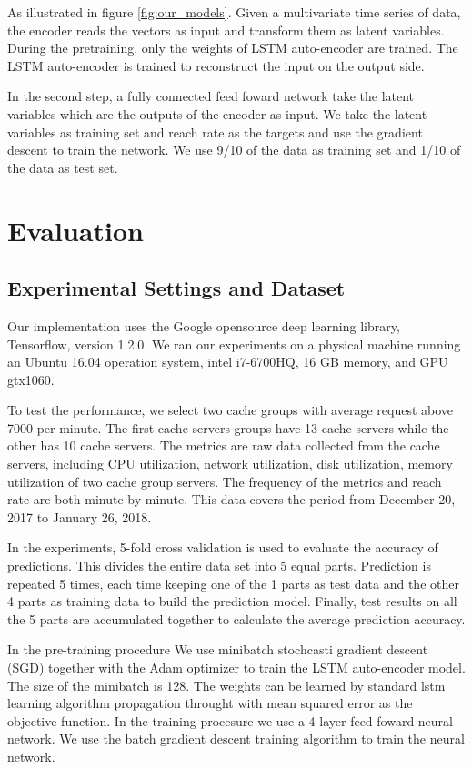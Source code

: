 \documentclass[5p]{elsarticle}
\newcommand{\dabiaolv}{reach rate }
\begin{document}
As illustrated in figure \ref{fig:our_models}. Given a multivariate time series of data, the encoder reads the vectors as input and transform them as latent variables. During the pretraining, only the weights of LSTM auto-encoder are trained. The LSTM auto-encoder is trained to reconstruct the input on the output side. 

In the second step, a fully connected feed foward network take the latent variables which are the outputs of the encoder as input. We take the latent variables as training set and \dabiaolv as the targets and use the gradient descent to train the network. We use 9/10 of the data as training set and 1/10 of the data as test set.

\section{Evaluation}
\subsection{Experimental Settings and Dataset}
Our implementation uses the Google opensource deep learning library, Tensorflow\cite{TensorFlow}, version 1.2.0. We ran our experiments on a physical machine running an Ubuntu 16.04 operation system, intel i7-6700HQ, 16 GB memory, and GPU gtx1060.

To test the performance, we select two cache groups with average request above 7000 per minute. The first cache servers groups have 13 cache servers while the other has 10 cache servers. The metrics are raw data collected from the cache servers, including CPU utilization, network utilization, disk utilization, memory utilization of two cache group servers. The frequency of the metrics and \dabiaolv are both minute-by-minute. This data covers the period from December 20, 2017 to January 26, 2018.

In the experiments, 5-fold cross validation is used to evaluate the accuracy of predictions. This divides the entire data set into 5 equal parts.  Prediction is repeated 5 times, each time keeping one of the 1 parts as test data and the other 4 parts as training data to build the prediction model. Finally, test results on all the 5 parts are accumulated together to calculate the average prediction accuracy.

In the pre-training procedure We use minibatch stochcasti gradient descent (SGD) together with the Adam optimizer to train the LSTM auto-encoder model. The size of the minibatch is 128. The weights can be learned by standard lstm learning algorithm propagation throught with mean squared error as the objective function. In the training procesure we use a 4 layer feed-foward neural network. We use the batch gradient descent training algorithm to train the neural network.
\end{document}
